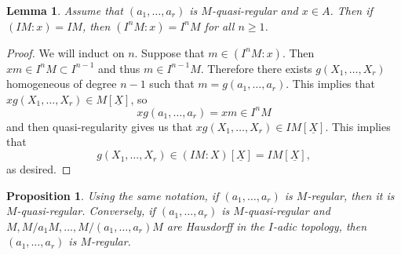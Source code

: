 \documentclass[leqno, openany]{memoir}
\newtheorem{prop}[thm]{Proposition}
\newtheorem{lem}[thm]{Lemma}
\theoremstyle{definition}
\theoremstyle{remark}
\theoremstyle{plain}
\theoremstyle{definition}
\theoremstyle{remark}
\newcommand{\ul}[1]{\underline{#1}}
\begin{document}
\begin{lem}
    Assume that $(a_1, \ldots, a_r)$ is $M$-quasi-regular and $x \in A$. Then if $(IM : x) = IM$, then $(I^n M : x) = I^n M$ for all $n \geq 1$. 
\end{lem}

\begin{proof}
    We will induct on $n$. Suppose that $m \in (I^n M : x)$. Then $xm \in I^n M \subset I^{n-1}$ and thus $m \in I^{n-1}M$. Therefore there exists $g(X_1, \ldots, X_r)$ homogeneous of degree $n-1$ such that $m = g(a_1, \ldots, a_r)$. This implies that $x g(X_1, \ldots, X_r) \in M[\ul{X}]$, so 
    \[ xg(a_1, \ldots, a_r) = xm \in I^n M \]
    and then quasi-regularity gives us that $xg(X_1, \ldots, X_r) \in IM[\ul{X}]$. This implies that 
    \[ g(X_1, \ldots, X_r) \in (IM : X)[\ul{X}] = IM[\ul{X}], \]  
    as desired.
\end{proof}

\begin{prop}
    Using the same notation, if $(a_1, \ldots, a_r)$ is $M$-regular, then it is $M$-quasi-regular. Conversely, if $(a_1, \ldots, a_r)$ is $M$-quasi-regular and $M, M/a_1 M, \ldots, M/(a_1, \ldots, a_r)M$ are Hausdorff in the $I$-adic topology, then $(a_1, \ldots, a_r)$ is $M$-regular.
\end{prop}
\end{document}
